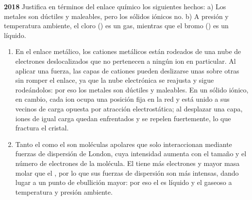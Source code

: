 \begin{exerciseEVAU}
    \textbf{ 2018 } Justifica en términos del enlace químico los siguientes hechos: a) Los metales son dúctiles y maleables, pero los sólidos iónicos no. b) A presión y temperatura ambiente, el cloro () es un gas, mientras que el bromo () es un líquido.

    \begin{solu}


        \begin{enumerate}[label=\letraminuscula]
            \item En el enlace metálico, los cationes metálicos están rodeados de una nube de electrones deslocalizados que no pertenecen a ningún ion en particular. Al aplicar una fuerza, las capas de cationes pueden deslizarse unas sobre otras sin romper el enlace, ya que la nube electrónica se reajusta y sigue rodeándolos: por eso los metales son dúctiles y maleables. En un sólido iónico, en cambio, cada ion ocupa una posición fija en la red y está unido a sus vecinos de carga opuesta por atracción electrostática; al desplazar una capa, iones de igual carga quedan enfrentados y se repelen fuertemente, lo que fractura el cristal.

            \item Tanto el  como el  son moléculas apolares que solo interaccionan mediante fuerzas de dispersión de London, cuya intensidad aumenta con el tamaño y el número de electrones de la molécula. El  tiene más electrones y mayor masa molar que el , por lo que sus fuerzas de dispersión son más intensas, dando lugar a un punto de ebullición mayor: por eso el  es líquido y el  gaseoso a temperatura y presión ambiente.
        \end{enumerate}
    \end{solu}
\end{exerciseEVAU}

